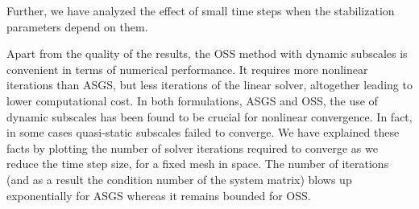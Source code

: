 Further, we have analyzed the effect of small time steps when the stabilization parameters depend on them.


Apart from the quality of the results, the OSS method with dynamic subscales is convenient in terms of numerical performance. It requires more nonlinear iterations than ASGS, but less iterations of the linear solver, altogether leading to lower computational cost. In both formulations, ASGS and OSS, the use of dynamic subscales has been found to be crucial for nonlinear convergence. In fact, in some cases quasi-static subscales failed to converge. We have explained these facts by plotting the number of solver iterations required to converge as we reduce the time step size, for a fixed mesh in space. The number of iterations (and as a result the condition number of the system matrix) blows up exponentially for ASGS whereas it remains bounded for OSS.